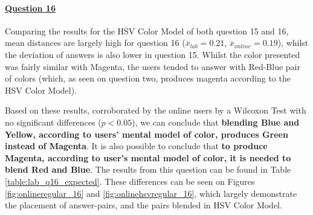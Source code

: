 \paragraph{\ul{Question 16}}
%
Comparing the results for the HSV Color Model of both question 15 and 16, mean distances are largely high for question 16
($\overline{x}_{lab} = 0.21$, $\overline{x}_{online} = 0.19$), whilst the deviation of answers is also lower in question 15.
Whilst the color presented was fairly similar with Magenta, the users tended to answer with Red-Blue pair of colors (which, as seen on question two, produces magenta according
to the HSV Color Model). \par
%
Based on these results, corroborated by the online users by a Wilcoxon Test with no significant differences ($p < 0.05$), we can conclude that \textbf{blending Blue and Yellow, according to users' mental model of color, produces Green instead of Magenta}. It is also
possible to conclude that \textbf{to produce Magenta, according to user's mental model of color, it is needed to blend Red and Blue}. The results from
this question can be found in Table \ref{table:lab_q16_expected}. These differences can be seen on Figures \ref{fig:onlineregular_16} and \ref{fig:onlinehsvregular_16}, which largely
demonstrate the placement of answer-pairs, and the pairs blended in HSV Color Model.
%
